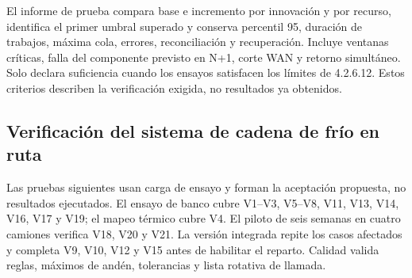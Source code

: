 El informe de prueba compara base e incremento por innovación y por recurso, identifica el primer umbral superado y conserva percentil 95, duración de trabajos, máxima cola, errores, reconciliación y recuperación. Incluye ventanas críticas, falla del componente previsto en N+1, corte WAN y retorno simultáneo. Solo declara suficiencia cuando los ensayos satisfacen los límites de 4.2.6.12. Estos criterios describen la verificación exigida, no resultados ya obtenidos.

\label{fuente-16-anexo-4b-memoria-calculo-fin}

\subsection*{Verificación del sistema de cadena de frío en ruta}
Las pruebas siguientes usan carga de ensayo y forman la aceptación propuesta, no resultados ejecutados. El ensayo de banco cubre V1–V3, V5–V8, V11, V13, V14, V16, V17 y V19; el mapeo térmico cubre V4. El piloto de seis semanas en cuatro camiones verifica V18, V20 y V21. La versión integrada repite los casos afectados y completa V9, V10, V12 y V15 antes de habilitar el reparto. Calidad valida reglas, máximos de andén, tolerancias y lista rotativa de llamada.

